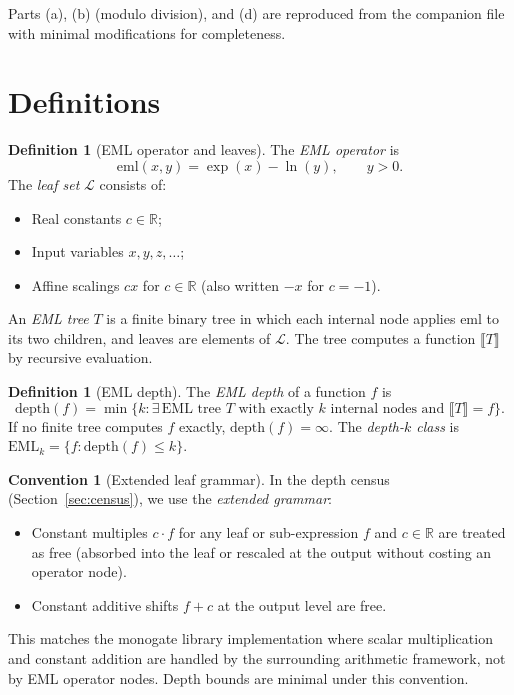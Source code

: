 \documentclass[12pt,a4paper]{article}
\theoremstyle{definition}
\newtheorem{definition}[theorem]{Definition}
\newtheorem{convention}[theorem]{Convention}
\theoremstyle{remark}
\begin{document}
Parts (a), (b) (modulo division), and (d) are reproduced from the companion
file with minimal modifications for completeness.

\section{Definitions}

\begin{definition}[EML operator and leaves]\label{def:eml}
The \emph{EML operator} is
\[
  \mathrm{eml}(x,y) = \exp(x) - \ln(y), \qquad y > 0.
\]
The \emph{leaf set} $\mathcal{L}$ consists of:
\begin{itemize}
  \item Real constants $c \in \mathbb{R}$;
  \item Input variables $x, y, z, \ldots$;
  \item Affine scalings $cx$ for $c \in \mathbb{R}$ (also written $-x$ for $c=-1$).
\end{itemize}
An \emph{EML tree} $T$ is a finite binary tree in which each internal node
applies $\mathrm{eml}$ to its two children, and leaves are elements of $\mathcal{L}$.
The tree computes a function $\llbracket T\rrbracket$ by recursive evaluation.
\end{definition}

\begin{definition}[EML depth]\label{def:depth}
The \emph{EML depth} of a function $f$ is
\[
  \mathrm{depth}(f) = \min\{k : \exists\,\text{EML tree }T\text{ with exactly }k
  \text{ internal nodes and }\llbracket T\rrbracket = f\}.
\]
If no finite tree computes $f$ exactly, $\mathrm{depth}(f) = \infty$.
The \emph{depth-$k$ class} is $\mathrm{EML}_k = \{f : \mathrm{depth}(f) \leq k\}$.
\end{definition}

\begin{convention}[Extended leaf grammar]\label{conv:grammar}
In the depth census (Section~\ref{sec:census}), we use the \emph{extended grammar}:
\begin{itemize}
  \item Constant multiples $c \cdot f$ for any leaf or sub-expression $f$ and
        $c \in \mathbb{R}$ are treated as free (absorbed into the leaf or rescaled
        at the output without costing an operator node).
  \item Constant additive shifts $f + c$ at the output level are free.
\end{itemize}
This matches the monogate library implementation where scalar multiplication
and constant addition are handled by the surrounding arithmetic framework,
not by EML operator nodes.  Depth bounds are minimal under this convention.
\end{convention}
\end{document}
